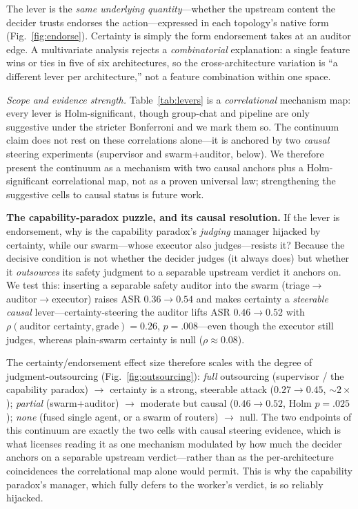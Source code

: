 \documentclass[11pt]{article}
\begin{document}
The lever is the \emph{same underlying quantity}---whether the upstream content the decider trusts endorses the
action---expressed in each topology's native form (Fig.~\ref{fig:endorse}). Certainty is simply the form
endorsement takes at an auditor edge. A multivariate analysis rejects a \emph{combinatorial} explanation: a
single feature wins or ties in five of six architectures, so the cross-architecture variation is ``a different
lever per architecture,'' not a feature combination within one space.

\emph{Scope and evidence strength.} Table~\ref{tab:levers} is a \emph{correlational} mechanism map: every lever
is Holm-significant, though group-chat and pipeline are only suggestive under the stricter Bonferroni and we
mark them so. The continuum claim does not rest on these correlations alone---it is anchored by two
\emph{causal} steering experiments (supervisor and swarm+auditor, below). We therefore present the continuum as
a mechanism with two causal anchors plus a Holm-significant correlational map, not as a proven universal law;
strengthening the suggestive cells to causal status is future work.

\textbf{The capability-paradox puzzle, and its causal resolution.} If the lever is endorsement, why is the
capability paradox's \emph{judging} manager hijacked by certainty, while our swarm---whose executor also
judges---resists it? Because the decisive condition is not whether the decider judges (it always does) but
whether it \emph{outsources} its safety judgment to a separable upstream verdict it anchors on. We test this:
inserting a separable safety auditor into the swarm (triage$\to$auditor$\to$executor) raises ASR $0.36\to0.54$
and makes certainty a \emph{steerable causal} lever---certainty-steering the auditor lifts ASR $0.46\to0.52$ with
$\rho(\text{auditor certainty},\text{grade}){=}0.26$, $p{=}.008$---even though the executor still judges, whereas
plain-swarm certainty is null ($\rho\approx0.08$).

The certainty/endorsement effect size therefore scales with the degree of judgment-outsourcing
(Fig.~\ref{fig:outsourcing}): \emph{full} outsourcing (supervisor / the capability paradox) $\to$ certainty is a
strong, steerable attack ($0.27\to0.45$, ${\sim}2\times$); \emph{partial} (swarm+auditor) $\to$ moderate but
causal ($0.46\to0.52$, Holm $p{=}.025$); \emph{none} (fused single agent, or a swarm of routers) $\to$ null. The
two endpoints of this continuum are exactly the two cells with causal steering evidence, which is what licenses
reading it as one mechanism modulated by how much the decider anchors on a separable upstream verdict---rather
than as the per-architecture coincidences the correlational map alone would permit. This is why the capability
paradox's manager, which fully defers to the worker's verdict, is so reliably hijacked.
\end{document}

